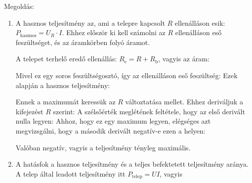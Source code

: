 
\ifdefined\megoldas
 
 Megoldás: 

 \begin{enumerate}[label=\alph*),itemsep=0pt]
  \item
   A hasznos teljesítmény az, ami a telepre kapcsolt $R$ ellenálláson esik: $P_\text{hasznos}=U_R\cdot I$. Ehhez először ki kell számolni az $R$ ellenálláson eső feszültséget, és az áramkörben folyó áramot. 

   A telepet terhelő eredő ellenállás: $R_\text{e}=R+R_\text{b}$, vagyis az áram:

   Mivel ez egy soros feszültségosztó, így az ellenálláson eső feszültség:
   Ezek alapján a hasznos teljesítmény:

   Ennek a maximumát keressük az $R$ változtatása mellet. Ehhez deriváljuk a kifejezést $R$ szerint:
   A szélsőérték meglétének feltétele, hogy az első derivált nulla legyen:
   Ahhoz, hogy ez egy maximum legyen, elégséges azt megvizsgálni, hogy a második derivált negatív-e ezen a helyen:

   Valóban negatív, vagyis a teljesítmény tényleg maximális.

  \item
   A hatásfok a hasznos teljesítmény és a teljes befektetett teljesítmény aránya. A telep által leadott teljesítmény itt $P_\text{telep}=UI$, vagyis 
 \end{enumerate}

\fi